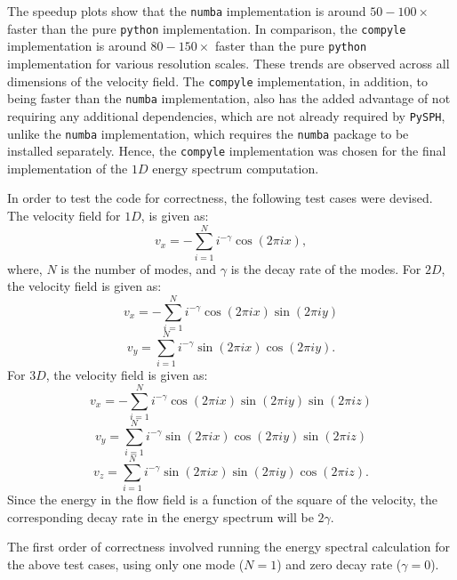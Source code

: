 The speedup plots show that the \texttt{numba} implementation is around $50-100\times$ faster than the pure \texttt{python} implementation. In comparison, the \texttt{compyle} implementation is around $80-150\times$ faster than the pure \texttt{python} implementation for various resolution scales. These trends are observed across all dimensions of the velocity field. The \texttt{compyle} implementation, in addition, to being faster than the \texttt{numba} implementation, also has the added advantage of not requiring any additional dependencies, which are not already required by \texttt{PySPH}, unlike the \texttt{numba} implementation, which requires the \texttt{numba} package to be installed separately. Hence, the \texttt{compyle} implementation was chosen for the final implementation of the $1D$ energy spectrum computation.

In order to test the code for correctness, the following test cases were devised. The velocity field for $1D$, is given as:
\begin{equation}
    v_x = - \sum_{i=1}^{N} i^{-\gamma} \cos(2 \pi i x),
\end{equation}
where, $N$ is the number of modes, and $\gamma$ is the decay rate of the modes.
For $2D$, the velocity field is given as:
\begin{equation}
    v_x = - \sum_{i=1}^{N} i^{-\gamma} \cos(2 \pi i x) \sin(2 \pi i y)
\end{equation}
\begin{equation}
    v_y = \sum_{i=1}^{N} i^{-\gamma} \sin(2 \pi i x) \cos(2 \pi i y).
\end{equation}
For $3D$, the velocity field is given as:
\begin{equation}
    v_x = - \sum_{i=1}^{N} i^{-\gamma} \cos(2 \pi i x) \sin(2 \pi i y) \sin(2 \pi i z)
\end{equation}
\begin{equation}
    v_y = \sum_{i=1}^{N} i^{-\gamma} \sin(2 \pi i x) \cos(2 \pi i y) \sin(2 \pi i z)
\end{equation}
\begin{equation}
    v_z = \sum_{i=1}^{N} i^{-\gamma} \sin(2 \pi i x) \sin(2 \pi i y) \cos(2 \pi i z).
\end{equation}
Since the energy in the flow field is a function of the square of the velocity, the corresponding decay rate in the energy spectrum will be $2\gamma$.

The first order of correctness involved running the energy spectral calculation for the above test cases, using only one mode ($N=1$) and zero decay rate ($\gamma=0$).

